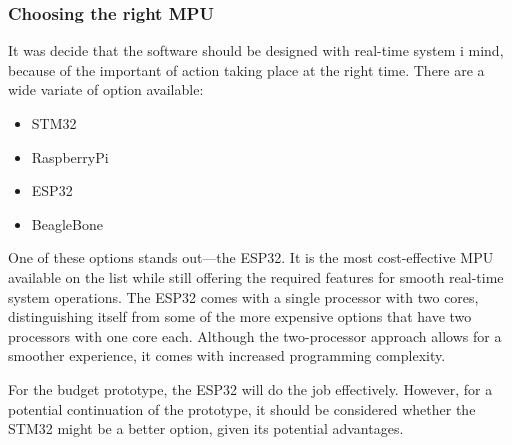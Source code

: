 \documentclass[../report.tex]{subfiles}
\begin{document}
    \subsubsection{Choosing the right MPU}
    It was decide that the software should be designed with real-time system i
    mind, because of the important of action taking place at the right time.
    There are a wide variate of option available:
    \begin{itemize}
        \item STM32
        \item RaspberryPi
        \item ESP32
        \item BeagleBone
    \end{itemize} 
    One of these options stands out—the ESP32. It is the most cost-effective
    MPU available on the list while still offering the required features for
    smooth real-time system operations. The ESP32 comes with a single processor
    with two cores, distinguishing itself from some of the more expensive
    options that have two processors with one core each. Although the
    two-processor approach allows for a smoother experience, it comes with
    increased programming complexity.

    For the budget prototype, the ESP32 will do the job effectively. However,
    for a potential continuation of the prototype, it should be considered
    whether the STM32 might be a better option, given its potential advantages.
\end{document}
